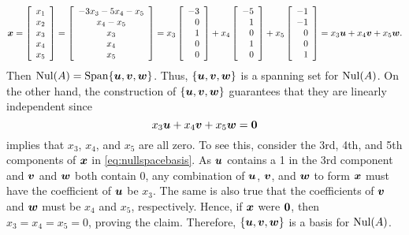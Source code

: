 \begin{Exam}
\begin{equation}\label{eq:nullspacebasis} \bb x = \vr{x_1\\x_2\\x_3\\x_4\\x_5} =\mtx{c}{-3x_3-5x_4-x_5\\ x_4-x_5\\ x_3 \\ x_4\\x_5} = x_3\vr{-3\\0\\1\\0\\0} + x_4\vr{-5\\1\\0\\1\\0} + x_5\vr{-1\\-1\\0\\0\\1} = x_3\bb u + x_4\bb v + x_5\bb w.\end{equation} Then $\nul(A)=\Span\{\bb u, \bb v, \bb w\}$. Thus, $\{\bb u, \bb v, \bb w\}$ is a spanning set for $\nul(A)$. On the other hand, the construction of $\{\bb u, \bb v, \bb w\}$ guarantees that they are linearly independent since 
\[x_3\bb u + x_4\bb v + x_5\bb w = \bb 0\] implies that $x_3$, $x_4$, and $x_5$ are all zero. To see this, consider the 3rd, 4th, and 5th components of $\bb x$ in \eqref{eq:nullspacebasis}. As $\bb u$ contains a 1 in the 3rd component and $\bb v$ and $\bb w$ both contain $0$, any combination of $\bb u$, $\bb v$, and $\bb w$ to form $\bb x$ must have the coefficient of $\bb u$ be $x_3$. The same is also true that the coefficients of $\bb v$ and $\bb w$ must be $x_4$ and $x_5$, respectively. Hence, if $\bb x$ were $\bb 0$, then $x_3=x_4=x_5=0$, proving the claim. Therefore, $\{\bb u, \bb v, \bb w\}$ is a basis for $\nul(A)$.
\end{Exam}\vs

